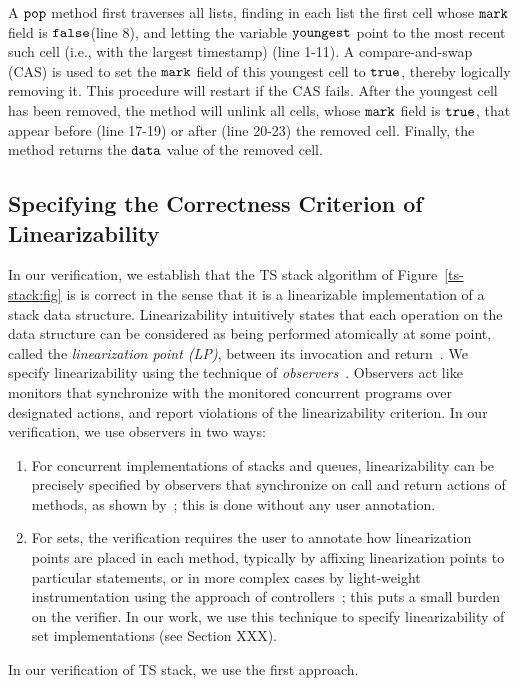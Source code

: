 A ${\tt pop}$ method first traverses all lists, finding in each list
the first cell whose ${\tt mark}$ field is ${\tt false}$(line 8), and letting the variable ${\tt youngest}$ point to the most recent such cell
(i.e., with the largest timestamp) (line 1-11).
A compare-and-swap (CAS) is used
to set the ${\tt mark}$ field of this youngest cell to ${\tt true}$,
thereby logically removing it.
This procedure will restart if the CAS fails. After the youngest cell has been removed, the method will unlink all cells, whose ${\tt mark}$ field is ${\tt true}$,
that appear before (line 17-19) or after (line 20-23) the removed cell.
Finally, the method returns the ${\tt data}$ value of the removed cell.


\subsection{Specifying the Correctness Criterion of Linearizability}
In our verification, we establish that the TS stack algorithm of
Figure~\ref{ts-stack:fig} is is correct in the sense that it is a
linearizable implementation of a stack data structure.
Linearizability intuitively states that
each operation on the data structure can be considered as being
performed atomically at some point, called the {\em linearization point (LP)},
between its invocation and return~\cite{HeWi:linearizability}.
We specify linearizability using the technique of
{\em observers}~\cite{AHHR:integrated}. Observers act like monitors that
synchronize with the monitored concurrent programs over designated actions,
and report violations of the linearizability criterion. In our verification,
we use observers in two ways:
\begin{enumerate}
\item
  For concurrent implementations of stacks and queues,
  linearizability can be precisely specified by
  observers that synchronize on call and return actions of
  methods, as shown by~\cite{BEEH:icalp15,HSV:concur13}; this is done without
 any user annotation.
\item
  For sets, the verification requires the user to annotate how linearization
  points are placed in each method, typically by affixing
  linearization points to particular statements, or in more complex cases by
  light-weight instrumentation using the approach of
  controllers~\cite{Quy:sas16}; this puts a small burden on
  the verifier.
In our work, we use this technique to specify linearizability of
set implementations (see Section XXX).
\end{enumerate}
In our verification of TS stack, we use the first approach. 

